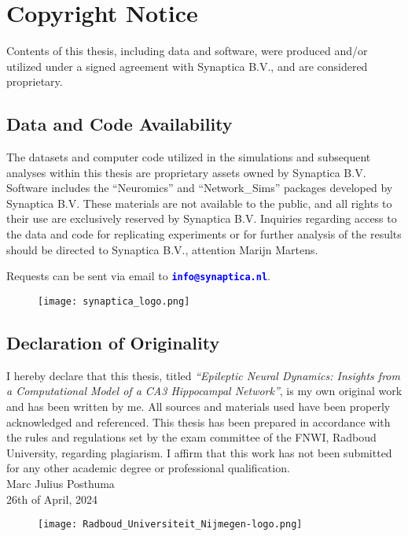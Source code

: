 \section*{Copyright Notice}
Contents of this thesis, including data and software, were produced and/or utilized
under a signed agreement with Synaptica B.V., and are considered proprietary.

\subsection*{Data and Code Availability}
The datasets and computer code utilized in the simulations and subsequent analyses within this thesis
are proprietary assets owned by Synaptica B.V. Software includes the ``Neuromics'' and ``Network\_Sims'' packages
developed by Synaptica B.V. These materials are not available to the public,
and all rights to their use are exclusively reserved by Synaptica B.V.
Inquiries regarding access to the data and code for replicating experiments or for further analysis of
the results should be directed to Synaptica B.V., attention Marijn Martens.
\par
\vspace{12pt} %

\noindent Requests can be sent via email to \textbf{\textcolor{blue}{\texttt{info@synaptica.nl}}}.

\vspace{12pt}

\begin{figure}[h]
    \centering
    \texttt{[image: synaptica\_logo.png]}
\end{figure}

\vfill

\subsection*{Declaration of Originality}
I hereby declare that this thesis, titled \textit{``Epileptic Neural Dynamics: Insights from a Computational
    Model of a CA3 Hippocampal Network''}, is my own original work and has been written by me.
All sources and materials used have been properly acknowledged and referenced.
This thesis has been prepared in accordance with the rules and regulations set by the exam committee of the FNWI,
Radboud University, regarding plagiarism. I affirm that this work has not been submitted for any other
academic degree or professional qualification.\\

\noindent Marc Julius Posthuma\\
26th of April, 2024

\begin{figure}[h]
    \centering
    \texttt{[image: Radboud\_Universiteit\_Nijmegen-logo.png]}
\end{figure}